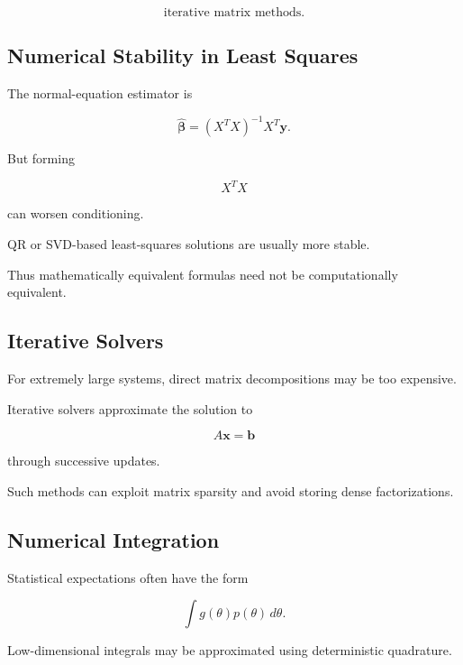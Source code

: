 \[
\boxed{
\text{iterative matrix methods}.
}
\]

\subsection{Numerical Stability in Least Squares}
\label{subsec:numerical-stability-least-squares}

The normal-equation estimator is

\[
\widehat{\boldsymbol{\beta}}
=
(
X^TX
)^{-1}
X^T\mathbf{y}.
\]

But forming

\[
X^TX
\]

can worsen conditioning.

QR or SVD-based least-squares solutions are usually more stable.

Thus mathematically equivalent formulas need not be computationally
equivalent.

\subsection{Iterative Solvers}
\label{subsec:iterative-linear-solvers-statistics}

For extremely large systems, direct matrix decompositions may be too
expensive.

Iterative solvers approximate the solution to

\[
\boxed{
A\mathbf{x}
=
\mathbf{b}
}
\]

through successive updates.

Such methods can exploit matrix sparsity and avoid storing dense
factorizations.

\subsection{Numerical Integration}
\label{subsec:numerical-integration-statistics}

Statistical expectations often have the form

\[
\boxed{
\int
g(\theta)
p(\theta)
\,d\theta.
}
\]

Low-dimensional integrals may be approximated using deterministic
quadrature.

